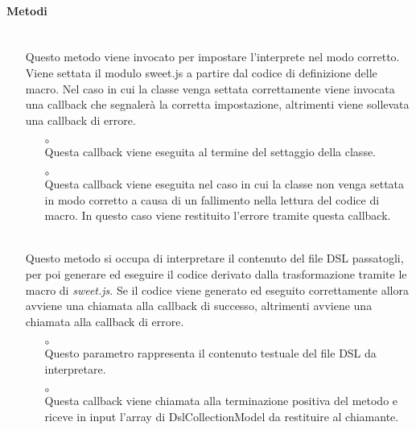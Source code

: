 \paragraph*{Metodi}
\begin{itemize}
\item[]  \\ Questo metodo viene invocato per impostare l'interprete nel modo corretto. Viene settata il modulo sweet.js a partire dal codice di definizione delle macro. Nel caso in cui la classe venga settata correttamente viene invocata una callback che segnalerà la corretta impostazione, altrimenti viene sollevata una callback di errore.
\begin{itemize}\addtolength{\itemsep}{-0.5\baselineskip}
\item[$\circ$]  \\ Questa callback viene eseguita al termine del settaggio della classe.
\item[$\circ$]  \\ Questa callback viene eseguita nel caso in cui la classe non venga settata in modo corretto a causa di un fallimento nella lettura del codice di macro. In questo caso viene restituito l'errore tramite questa callback.
\end{itemize}
\item[]  \\ Questo metodo si occupa di interpretare il contenuto del file DSL passatogli, per poi generare ed eseguire il codice derivato dalla trasformazione tramite le macro di \textit{sweet.js}. Se il codice viene generato ed eseguito correttamente allora avviene una chiamata alla callback di successo, altrimenti avviene una chiamata alla callback di errore.
\begin{itemize}\addtolength{\itemsep}{-0.5\baselineskip}
\item[$\circ$]  \\ Questo parametro rappresenta il contenuto testuale del file DSL da interpretare.
\item[$\circ$]  \\ Questa callback viene chiamata alla terminazione positiva del metodo e riceve in input l'array di DslCollectionModel da restituire al chiamante.

\end{itemize}
\end{itemize}

